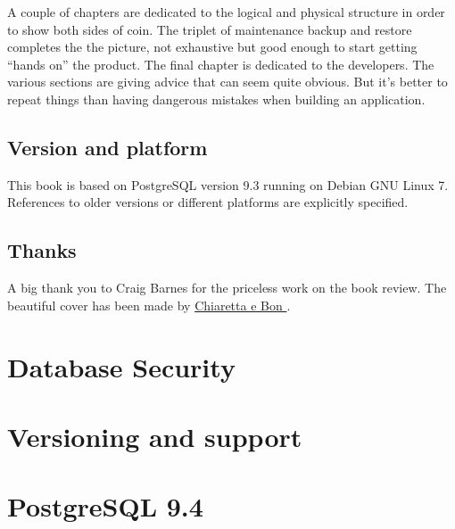 \documentclass[oneside]{book}
\begin{document}
A couple of chapters are dedicated to the logical and physical structure in
order to show both sides of coin.  The triplet of maintenance backup and restore completes the 
the picture, not exhaustive but good enough to start getting ``hands on'' the product.
The final chapter is dedicated to the developers. The various sections are 
giving advice that can seem quite obvious. But it's better to repeat things than having dangerous 
mistakes when building an application. 

\section*{Version and platform}
This book is based on PostgreSQL version 9.3 running on Debian GNU Linux 7.
References to older versions or different platforms are explicitly specified.

\section*{Thanks}
A big thank you to Craig Barnes for the priceless work on the book review.\newline
The beautiful cover has been made by \href{http://www.bonland.eu/}{
Chiaretta e Bon }.\newline














\appendix
\chapter{Database Security}
\chapter{Versioning and support}
\chapter{PostgreSQL 9.4}

\listoffigures
\listoftables
\printindex{}
\end{document}
